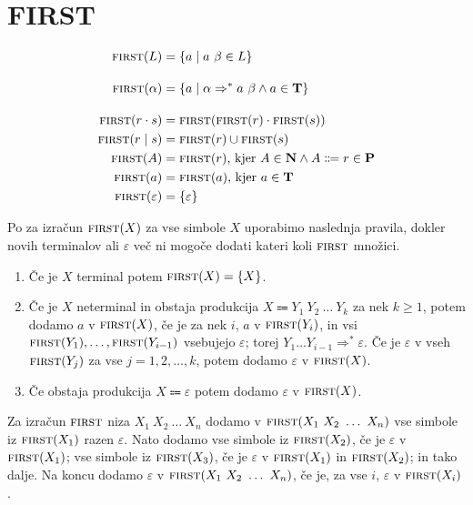 \documentclass{report}
\newcommand{\Null}{\varepsilon}
\newcommand{\Seq}{\cdot}
\newcommand{\Spc}{\ }
\newcommand{\Union}{\mathrel{|}}
\newcommand{\Set}[1]{\mathbf{#1}}
\newcommand{\FIRST}{\textsc{first}}
\newcommand{\Terminals}{\Set{T}}
\newcommand{\Productions}{\Set{P}}
\newcommand{\NonTerminals}{\Set{N}}
\newcommand{\Arrow}{\Coloneq}
\newcommand{\DeriveStar}{\Rightarrow^\ast}
\newcommand{\NT}[1]{{#1}}
\newcommand{\T}[1]{{#1}}
\newcommand{\Sym}[1]{{#1}}
\begin{document}
\section{FIRST}
\begin{tcolorbox}[title={Definicija}]
  \begin{equation*}
    \begin{aligned}
      \FIRST(L) &= \{ \T{a} \mid \T{a} \Spc \beta \in L \}\\[1em]
      \FIRST(\alpha) &= \{\T{a} \mid \alpha \DeriveStar \T{a} \Spc \beta \land \T{a} \in \Terminals\}\\[1em]
      \FIRST(r \Seq s) &= \FIRST(\FIRST(r) \Seq \FIRST(s))\\
      \FIRST(r \Union s) &= \FIRST(r) \cup \FIRST(s)\\
      \FIRST(\NT{A}) &= \FIRST(r)\text{, kjer } \T{A} \in \NonTerminals \land \NT{A} \Arrow r \in \Productions\\
      \FIRST(\T{a}) &= \FIRST(\T{a})\text{, kjer } \T{a} \in \Terminals\\
      \FIRST(\Null) &= \{\Null\}\\
    \end{aligned}
  \end{equation*}
\end{tcolorbox}

Po \cite{dragonbook} za izračun $\FIRST(\Sym{X})$ za vse simbole $\Sym{X}$ uporabimo naslednja pravila, dokler novih terminalov ali $\Null$ več ni mogoče dodati kateri koli $\FIRST$ množici.

\begin{enumerate}
  \item Če je $\Sym{X}$ terminal potem $\FIRST(\Sym{X}) = \{\Sym{X}\}$.
  \item Če je $\Sym{X}$ neterminal in obstaja produkcija $\Sym{X} \Arrow \Sym{Y}_1 \Spc \Sym{Y}_2 \Spc \dots \Spc \Sym{Y}_k$ za nek $k \geq 1$, potem dodamo $\T{a}$ v $\FIRST(\Sym{X})$, če je za nek $i$, $\T{a}$ v $\FIRST(\Sym{Y}_i)$, in vsi $\FIRST(\Sym{Y}_1), \dots, \FIRST(\Sym{Y}_{i - 1})$ vsebujejo $\Null$; torej $\Sym{Y}_1 \dots \Sym{Y}_{i - 1} \DeriveStar \Null$.
    Če je $\Null$ v vseh $\FIRST(\Sym{Y}_j)$ za vse $j = 1, 2, \dots, k$, potem dodamo $\Null$ v $\FIRST(\Sym{X})$.
  \item Če obstaja produkcija $\Sym{X} \Arrow \Null$ potem dodamo $\Null$ v $\FIRST(\Sym{X})$.
\end{enumerate}

Za izračun $\FIRST$ niza $\Sym{X}_1 \Spc \Sym{X}_2 \Spc \dots \Spc \Sym{X}_n$ dodamo v $\FIRST(\Sym{X}_1 \Spc \Sym{X}_2 \Spc \dots \Spc \Sym{X}_n)$ vse simbole iz $\FIRST(\Sym{X}_1)$ razen $\Null$. Nato dodamo vse simbole iz $\FIRST(\Sym{X}_2)$, če je $\Null$ v $\FIRST(\Sym{X}_1)$; vse simbole iz $\FIRST(\Sym{X}_3)$, če je $\Null$ v $\FIRST(\Sym{X}_1)$ in $\FIRST(\Sym{X}_2)$; in tako dalje.
Na koncu dodamo $\Null$ v $\FIRST(\Sym{X}_1 \Spc \Sym{X}_2 \Spc \dots \Spc \Sym{X}_n)$, če je, za vse $i$, $\Null$ v $\FIRST(\Sym{X}_i)$.
\end{document}
